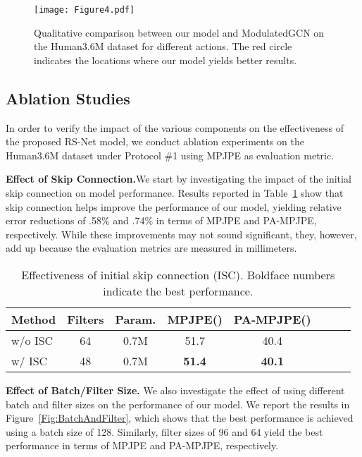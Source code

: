 \documentclass[10pt,journal]{IEEEtran}
\begin{document}
\begin{figure*}[!htb]
\centering
\texttt{[image: Figure4.pdf]}
\caption{Qualitative comparison between our model and ModulatedGCN on the Human3.6M dataset for different actions. The red circle indicates the locations where our model yields better results.}
\label{Fig:visual}
\end{figure*}

\subsection{Ablation Studies}
In order to verify the impact of the various components on the effectiveness of the proposed RS-Net model, we conduct ablation experiments on the Human3.6M dataset under Protocol \#1 using MPJPE as evaluation metric.

\medskip\noindent\textbf{Effect of Skip Connection.}\quad We start by investigating the impact of the initial skip connection on model performance. Results reported in Table~\ref{Tab:initialSkipConnection} show that skip connection helps improve the performance of our model, yielding relative error reductions of .58\% and .74\% in terms of MPJPE and PA-MPJPE, respectively. While these improvements may not sound significant, they, however, add up because the evaluation metrics are measured in millimeters.

\begin{table}[!htb]
\caption{Effectiveness of initial skip connection (ISC). Boldface numbers indicate the best performance.}
\small
\setlength{\tabcolsep}{2.5pt}
\medskip
\centering
\begin{tabular}{l*{7}{c}}
\toprule
Method & Filters  & Param. & MPJPE() & PA-MPJPE()\\
\midrule
w/o ISC & 64 & 0.7M & 51.7 & 40.4\\
w/ ISC & 48 & 0.7M & \textbf{51.4} & \textbf{40.1} \\
\bottomrule
\end{tabular}
\label{Tab:initialSkipConnection}
\end{table}
	
\medskip\noindent\textbf{Effect of Batch/Filter Size.}	\quad We also investigate the effect of using different batch and filter sizes on the performance of our model. We report the results in Figure~\ref{Fig:BatchAndFilter}, which shows that the best performance is achieved using a batch size of 128. Similarly, filter sizes of 96 and 64 yield the best performance in terms of MPJPE and PA-MPJPE, respectively.
\end{document}
